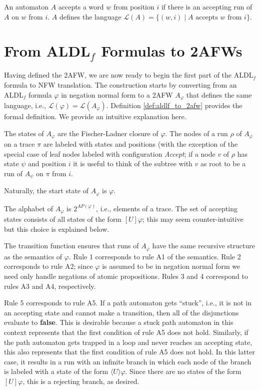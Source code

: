 \documentclass{lmcs}
\theoremstyle{definition}
\newcommand{\dbox}[1]{\langle #1 \rangle}
\newcommand{\bbox}[1]{[ #1 ]}
\DeclareMathOperator{\?}{?}
\begin{document}
An automaton $A$ accepts a word $w$ from position $i$ if there is an accepting run of $A$ on $w$ from $i$.
$A$ defines the language $\mathcal{L}(A) = \{ (w,i) \mid A \text{ accepts } w \text{ from } i \}$.

\section{\texorpdfstring{From ALDL$_f$ Formulas to 2AFWs}{From ALDLf Formulas to 2AFWs}}
\label{ch:2afwtoaldlf}

Having defined the 2AFW, we are now ready to begin the first part of the ALDL$_f$ formula to NFW translation. The construction starts by converting from an ALDL$_f$ formula $\varphi$  in negation normal form to a 2AFW $A_\varphi$ that defines the same language, i.e., $\mathcal{L}(\varphi) = \mathcal{L}(A_\varphi)$.
Definition \ref{def:aldlf_to_2afw} provides the formal definition. We provide an intuitive explanation here.

The states of $A_\varphi$ are the Fischer-Ladner closure of
$\varphi$. The nodes of a run $\rho$ of $A_\varphi$ on a trace $\pi$
are labeled with states and positions (with
the exception of the special case of leaf nodes labeled with configuration \textit{Accept};
if a node $v$ of $\rho$ has state $\psi$ and position $i$ it is useful to think of the
subtree with $v$ as root to be a run of $A_\psi$ on $\pi$ from $i$.

Naturally, the start state of $A_\varphi$ is $\varphi$.

The alphabet of $A_\varphi$ is $2^{AP(\varphi)}$, i.e., elements of a trace. The set of accepting states consists of all states of the form $\bbox{U}\varphi$; this may seem counter-intuitive but this choice is explained below.

The transition function ensures that runs of $A_\varphi$ have the same recursive structure as the semantics of $\varphi$. Rule 1 corresponds to rule A1 of the semantics. Rule 2 corresponds to rule A2; since $\varphi$ is assumed to be in negation normal form we need only handle
negations of atomic propositions. Rules 3 and 4 correspond to rules A3 and A4, respectively.

Rule 5 corresponds to rule A5. If a path automaton gets ``stuck'', i.e., it is not in an accepting state and cannot make a transition, then all of the disjunctions evaluate to \textbf{false}. This is desirable because a stuck path automaton in this context represents that the first condition of rule A5 does not hold. Similarly, if the path automaton gets trapped in a loop and never reaches an accepting state, this also represents that the first condition of rule A5 does not hold. In this latter case, it results in a run with an infinite branch in which each node of the branch is labeled with a state of the form $\dbox{U}\varphi$. Since there are no states of the form $\bbox{U}\varphi$, this is a rejecting branch, as desired.
\end{document}
